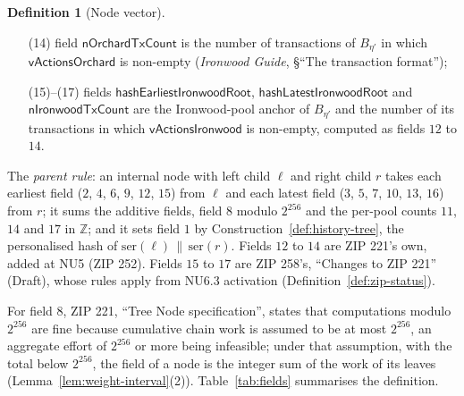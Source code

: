 \documentclass[11pt,a4paper]{article}
\theoremstyle{definition}
\newtheorem{definition}[theorem]{Definition}
\newcommand{\Z}{\mathbb{Z}}
\begin{document}
\begin{definition}[Node vector]
\begin{enumerate}[label=(\arabic*),
  leftmargin=\widthof{(15)--(17)}+\labelsep]
  $\mathsf{hashLatestOrchardRoot}$ are the Orchard-pool anchor of
  $B_{\eta'}$, the root of the Orchard pool's note commitment tree in the
  final treestate of $B_{\eta'}$ (\emph{Ironwood Guide}, \S``Anchors'',
  Definition ``Treestate and anchor'');
\item[(14)] field $\mathsf{nOrchardTxCount}$ is the number of transactions of
  $B_{\eta'}$ in which $\mathsf{vActionsOrchard}$ is non-empty
  (\emph{Ironwood Guide}, \S``The transaction format'');
\item[(15)--(17)] fields $\mathsf{hashEarliestIronwoodRoot}$,
  $\mathsf{hashLatestIronwoodRoot}$ and $\mathsf{nIronwoodTxCount}$ are the
  Ironwood-pool anchor of $B_{\eta'}$ and the number of its transactions in
  which $\mathsf{vActionsIronwood}$ is non-empty, computed as fields $12$ to
  $14$.
\end{enumerate}
The \emph{parent rule}: an internal node with left child $\ell$ and right
child $r$ takes each earliest field ($2$, $4$, $6$, $9$, $12$, $15$) from
$\ell$ and each latest field ($3$, $5$, $7$, $10$, $13$, $16$) from $r$;
it sums the additive fields, field $8$ modulo $2^{256}$ and the per-pool
counts $11$, $14$ and $17$ in $\Z$; and it sets field $1$ by
Construction~\ref{def:history-tree}, the personalised hash of
$\mathrm{ser}(\ell) \,\|\, \mathrm{ser}(r)$. Fields $12$ to $14$ are
ZIP 221's own, added at NU5 (ZIP 252). Fields $15$ to $17$ are ZIP 258's,
``Changes to ZIP 221'' (Draft), whose rules apply from NU6.3 activation
(Definition~\ref{def:zip-status}).
\end{definition}

For field $8$, ZIP 221, ``Tree Node specification'', states that
computations modulo $2^{256}$ are fine because cumulative chain work is
assumed to be at most $2^{256}$, an aggregate effort of $2^{256}$ or more
being infeasible; under that assumption, with the total below $2^{256}$, the
field of a node is the integer sum of the work of its leaves
(Lemma~\ref{lem:weight-interval}(2)). Table~\ref{tab:fields} summarises the
definition.
\end{document}
